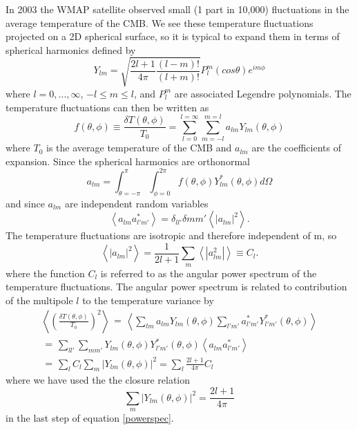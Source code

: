 \documentclass[a4paper,12pt]{article}
\def\mean#1{\left< #1 \right>}
\begin{document}
In 2003 the WMAP satellite observed small (1 part in 10,000) fluctuations in the average temperature of the CMB.  We see these temperature fluctuations projected on a 2D spherical surface, so it is typical to expand them in terms of spherical harmonics defined by
\begin{equation}\label{Ylm}
Y_{lm}=\sqrt{\frac{2l+1}{4\pi} \frac{(l-m)!}{(l+m)!}}P_l^m(cos\theta)e^{im\phi}
\end{equation}
where $l=0,...,\infty$, $-l \le m \le l$, and $P_l^m$ are associated Legendre polynomials.  The temperature fluctuations can then be written as
\begin{equation}\label{dTdT0}
f(\theta,\phi) \equiv \frac{\delta T(\theta,\phi)}{T_0} = \sum_{l=0}^{l=\infty} \sum_{m=-l}^{m=l} a_{lm} Y_{lm}(\theta,\phi)
\end{equation}
where $T_0$ is the average temperature of the CMB and $a_{lm}$ are the coefficients of expansion. Since the spherical harmonics are orthonormal
\begin{equation}\label{alm}
a_{lm} = \int_{\theta=-\pi}^{\pi}\int_{\phi=0}^{2\pi} f(\theta,\phi)Y_{lm}^*(\theta,\phi) d\Omega
\end{equation}
and since $a_{lm}$ are independent random variables
\begin{equation}\label{alm_var1}
\mean{a_{lm}a_{l'm'}^*} = \delta_{ll'}\delta{mm'}\mean{|a_{lm}|^2}.
\end{equation}
The temperature fluctuations are isotropic and therefore independent of m, so
\begin{equation}\label{alm_var2}
\mean{|a_{lm}|^2}=\frac{1}{2l+1} \sum_{m}\mean{|a_{lm}^2|} \equiv C_l.
\end{equation}
where the function $C_l$ is referred to as the angular power spectrum of the temperature fluctuations.  The angular power spectrum is related to contribution of the multipole $l$ to the temperature variance by
\begin{align}\label{powerspec}
\mean{\left(\frac{\delta T(\theta,\phi)}{T_0} \right)^2} \begin{aligned} = \end{aligned} \mean{\sum_{lm}a_{lm}Y_{lm}(\theta,\phi)\sum_{l'm'}a_{l'm'}^*Y_{l'm'}^*(\theta,\phi)} \nonumber \\
\begin{aligned} = \end{aligned} \sum_{ll'}\sum_{mm'}Y_{lm}(\theta,\phi)Y_{l'm'}^*(\theta,\phi)\mean{a_{lm}a_{l'm'}^* } \\
\begin{aligned} = \end{aligned} \sum_l C_l \sum_m |Y_{lm}(\theta,\phi)|^2 = \sum_l \frac{2l+1}{4\pi}C_l  \nonumber
\end{align}
where we have used the the closure relation
\begin{equation}\label{closure}
\sum_m |Y_{lm}(\theta,\phi)|^2 = \frac{2l+1}{4\pi}
\end{equation}
in the last step of equation \ref{powerspec}. \cite{Kurki-Suonio}
\end{document}
